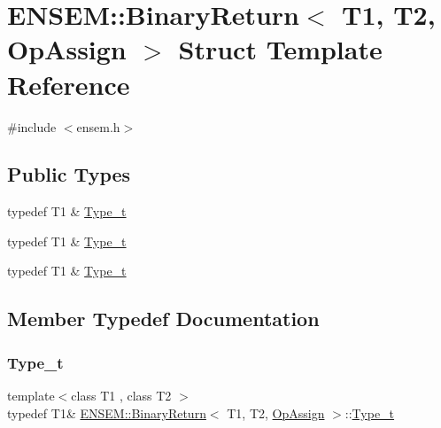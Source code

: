 \hypertarget{structENSEM_1_1BinaryReturn_3_01T1_00_01T2_00_01OpAssign_01_4}{}\section{E\+N\+S\+EM\+:\+:Binary\+Return$<$ T1, T2, Op\+Assign $>$ Struct Template Reference}
\label{structENSEM_1_1BinaryReturn_3_01T1_00_01T2_00_01OpAssign_01_4}


{\ttfamily \#include $<$ensem.\+h$>$}

\subsection*{Public Types}
\begin{DoxyCompactItemize}
\item 
typedef T1 \& \mbox{\hyperlink{structENSEM_1_1BinaryReturn_3_01T1_00_01T2_00_01OpAssign_01_4_a190b733bfdae86d7ca324cd9290b4100}{Type\+\_\+t}}
\item 
typedef T1 \& \mbox{\hyperlink{structENSEM_1_1BinaryReturn_3_01T1_00_01T2_00_01OpAssign_01_4_a190b733bfdae86d7ca324cd9290b4100}{Type\+\_\+t}}
\item 
typedef T1 \& \mbox{\hyperlink{structENSEM_1_1BinaryReturn_3_01T1_00_01T2_00_01OpAssign_01_4_a190b733bfdae86d7ca324cd9290b4100}{Type\+\_\+t}}
\end{DoxyCompactItemize}


\subsection{Member Typedef Documentation}
\mbox{\label{structENSEM_1_1BinaryReturn_3_01T1_00_01T2_00_01OpAssign_01_4_a190b733bfdae86d7ca324cd9290b4100}} 
\subsubsection{\texorpdfstring{Type\_t}{Type\_t}\hspace{0.1cm}{\footnotesize\ttfamily [1/3]}}
{\footnotesize\ttfamily template$<$class T1 , class T2 $>$ \\
typedef T1\& \mbox{\hyperlink{structENSEM_1_1BinaryReturn}{E\+N\+S\+E\+M\+::\+Binary\+Return}}$<$ T1, T2, \mbox{\hyperlink{structENSEM_1_1OpAssign}{Op\+Assign}} $>$\+::\mbox{\hyperlink{structENSEM_1_1BinaryReturn_3_01T1_00_01T2_00_01OpAssign_01_4_a190b733bfdae86d7ca324cd9290b4100}{Type\+\_\+t}}}

